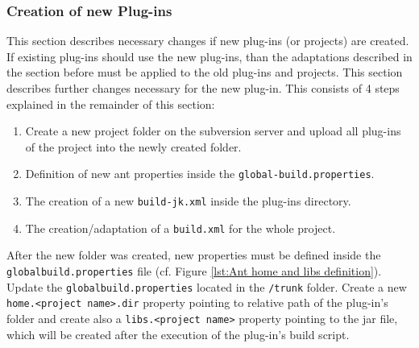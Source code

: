 \subsubsection{Creation of new Plug-ins}
\label{sec:Creation of new Plug-ins}
This section describes necessary changes if new plug-ins (or projects) are created. If existing plug-ins should use the new plug-ins, than the adaptations described in the section before must be applied to the old plug-ins and projects. This section describes further changes necessary for the new plug-in. This consists of 4 steps explained in the remainder of this section:\begin{enumerate}
	\item \label{Folder creation} Create a new project folder on the subversion server and upload all plug-ins of the project into the newly created folder.
	\item Definition of new ant properties inside the \texttt{global-build.properties}.
	\item The creation of a new \texttt{build-jk.xml} inside the plug-ins directory.
	\item The creation/adaptation of a \texttt{build.xml} for the whole project.
\end{enumerate}

After the new folder was created, new properties must be defined inside the \texttt{global\-build.properties} file (cf. Figure \vref{lst:Ant home and libs definition}). Update the \texttt{global\-build.properties} located in the \texttt{/trunk} folder. Create a new \texttt{home.<project name>.dir} property pointing to relative path of the plug-in's folder and create also a \texttt{libs.<project name>} property pointing to the jar file, which will be created after the execution of the plug-in's build script.

